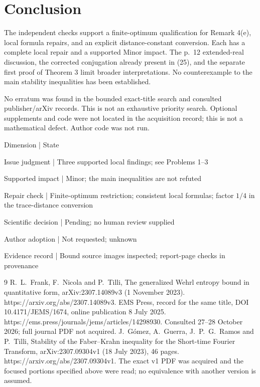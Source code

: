 \documentclass[10pt]{article}
\begin{document}
\section*{Conclusion}
The independent checks support a finite-optimum qualification for Remark 4(e), local formula repairs, and an explicit distance-constant conversion. Each has a complete local repair and a supported Minor impact. The p. 12 extended-real discussion, the corrected conjugation already present in (25), and the separate first proof of Theorem 3 limit broader interpretations. No counterexample to the main stability inequalities has been established.\par
No erratum was found in the bounded exact-title search and consulted publisher/arXiv records. This is not an exhaustive priority search. Optional supplements and code were not located in the acquisition record; this is not a mathematical defect. Author code was not run.\par
Dimension | State\par
Issue judgment | Three supported local findings; see Problems 1–3\par
Supported impact | Minor; the main inequalities are not refuted\par
Repair check | Finite-optimum restriction; consistent local formulas; factor \(1/4\) in the trace-distance conversion\par
Scientific decision | Pending; no human review supplied\par
Author adoption | Not requested; unknown\par
Evidence record | Bound source images inspected; report-page checks in provenance\par
9 R. L. Frank, F. Nicola and P. Tilli, The generalized Wehrl entropy bound in quantitative form, arXiv:2307.14089v3 (1 November 2023). https://arxiv.org/abs/2307.14089v3. EMS Press, record for the same title, DOI 10.4171/JEMS/1674, online publication 8 July 2025. https://ems.press/journals/jems/articles/14298930. Consulted 27–28 October 2026; full journal PDF not acquired. J. Gómez, A. Guerra, J. P. G. Ramos and P. Tilli, Stability of the Faber–Krahn inequality for the Short-time Fourier Transform, arXiv:2307.09304v1 (18 July 2023), 46 pages. https://arxiv.org/abs/2307.09304v1. The exact v1 PDF was acquired and the focused portions specified above were read; no equivalence with another version is assumed.\par
\end{document}

